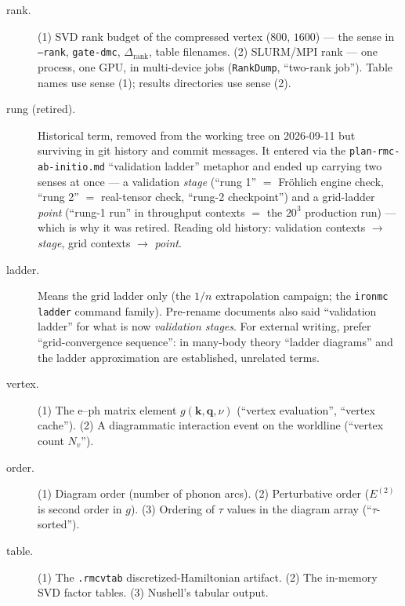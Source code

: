 \documentclass[11pt]{article}
\newcommand{\kv}{\mathbf{k}}
\newcommand{\qv}{\mathbf{q}}
\newcommand{\term}[1]{\item[#1.]}
\begin{document}
\begin{description}
\term{rank} (1) SVD rank budget of the compressed vertex ($800$, $1600$) --- the sense
  in \texttt{--rank}, \texttt{gate-dmc}, $\Delta_{\mathrm{rank}}$, table filenames.
  (2) SLURM/MPI rank --- one process, one GPU, in multi-device jobs (\texttt{RankDump},
  ``two-rank job''). Table names use sense (1); results directories use sense (2).

\term{rung (retired)} Historical term, removed from the working tree on 2026-09-11
  but surviving in git history and commit messages. It entered via the
  \texttt{plan-rmc-ab-initio.md} ``validation ladder'' metaphor and ended up carrying
  two senses at once --- a validation \emph{stage} (``rung 1'' $=$ Fr\"ohlich engine
  check, ``rung 2'' $=$ real-tensor check, ``rung-2 checkpoint'') and a grid-ladder
  \emph{point} (``rung-1 run'' in throughput contexts $=$ the $20^{3}$ production
  run) --- which is why it was retired. Reading old history: validation contexts
  $\to$ \emph{stage}, grid contexts $\to$ \emph{point}.

\term{ladder} Means the grid ladder only (the $1/n$ extrapolation campaign; the
  \texttt{ironmc ladder} command family). Pre-rename documents also said
  ``validation ladder'' for what is now \emph{validation stages}. For external
  writing, prefer ``grid-convergence sequence'': in many-body theory ``ladder
  diagrams'' and the ladder approximation are established, unrelated terms.

\term{vertex} (1) The e--ph matrix element $g(\kv,\qv,\nu)$ (``vertex evaluation'',
  ``vertex cache''). (2) A diagrammatic interaction event on the worldline (``vertex
  count $N_{v}$'').

\term{order} (1) Diagram order (number of phonon arcs). (2) Perturbative order
  ($E^{(2)}$ is second order in $g$). (3) Ordering of $\tau$ values in the diagram
  array (``$\tau$-sorted'').

\term{table} (1) The \texttt{.rmcvtab} discretized-Hamiltonian artifact. (2) The
  in-memory SVD factor tables. (3) Nushell's tabular output.
\end{description}
\end{document}
